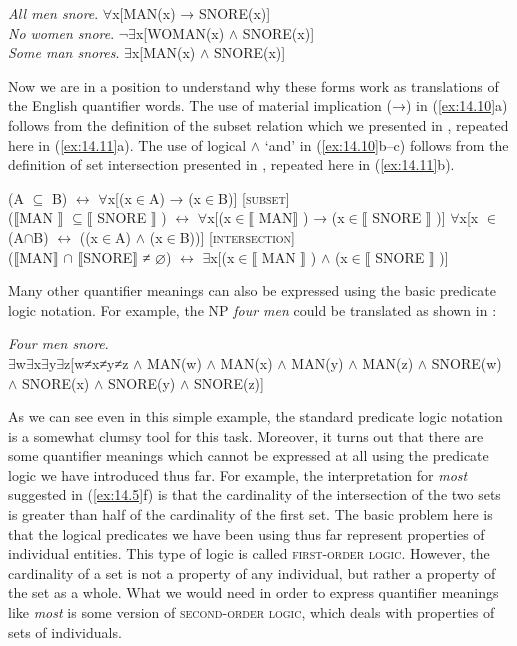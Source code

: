 \ea \label{ex:14.10}
\ea  \textit{All men snore}.  ${\forall}$x[MAN(x) → SNORE(x)]\\
\ex \textit{No women snore}.  ${\lnot}$${\exists}$x[WOMAN(x) $\wedge$ SNORE(x)]\\
\ex \textit{Some man snores}.  ${\exists}$x[MAN(x) $\wedge$ SNORE(x)]
                       \z
\z


Now we are in a position to understand why these forms work as translations of the English quantifier words. The use of material implication (→) in (\ref{ex:14.10}a) follows from the definition of the subset relation which we presented in , repeated here in (\ref{ex:14.11}a). The use of logical $\wedge$ ‘and’ in (\ref{ex:14.10}b--c) follows from the definition of set intersection presented in , repeated here in (\ref{ex:14.11}b).


\ea \label{ex:14.11}
\ea (A ${\subseteq}$ B)  $\leftrightarrow $  ${\forall}$x[(x${\in}$A) → (x${\in}$B)]  [\textsc{subset}]\\
  ($\llbracket$MAN $\rrbracket$  ${\subseteq} \llbracket$ SNORE $\rrbracket$ )  $\leftrightarrow $  ${\forall}$x[(x${\in}\llbracket$ MAN$\rrbracket$ ) → (x${\in}\llbracket$ SNORE $\rrbracket$ )]
\ex  ${\forall}$x[x ${\in}$ (A${\cap}$B)  $\leftrightarrow $  ((x${\in}$A) $\wedge$ (x${\in}$B))]  [\textsc{intersection}]\\
  ($\llbracket$MAN$\rrbracket$ ${\cap}$ $\llbracket$SNORE$\rrbracket$  ≠ ⌀) $\leftrightarrow $  ${\exists}$x[(x${\in}\llbracket$ MAN $\rrbracket$ ) $\wedge$ (x${\in} \llbracket$  SNORE $\rrbracket$ )]
\z \z


Many other quantifier meanings can also be expressed using the basic predicate logic notation. For example, the NP \textit{four men} could be translated as shown in :


\ea \label{ex:14.12}
\textit{Four men snore}.\\
${\exists}$w${\exists}$x${\exists}$y${\exists}$z[w≠x≠y≠z $\wedge$ MAN(w) $\wedge$ MAN(x) $\wedge$ MAN(y) $\wedge$ MAN(z) $\wedge$ SNORE(w) $\wedge$ SNORE(x) $\wedge$ SNORE(y) $\wedge$ SNORE(z)]
\z


As we can see even in this simple example, the standard predicate logic notation is a somewhat clumsy tool for this task. Moreover, it turns out that there are some quantifier meanings which cannot be expressed at all using the predicate logic we have introduced thus far. For example, the interpretation for \textit{most} suggested in (\ref{ex:14.5}f) is that the cardinality of the intersection of the two sets is greater than half of the cardinality of the first set. The basic problem here is that the logical predicates we have been using thus far represent properties of individual entities. This type of logic is called \textsc{first-order logic}. However, the cardinality of a set is not a property of any individual, but rather a property of the set as a whole. What we would need in order to express quantifier meanings like \textit{most} is some version of \textsc{second-order logic}, which deals with properties of sets of individuals.



